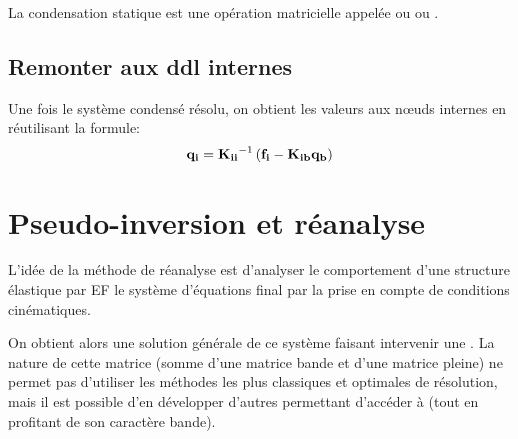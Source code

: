 La condensation statique est une opération matricielle 
appelée  ou  ou 
.

\medskip
\subsection{Remonter aux ddl internes}

Une fois le système condensé résolu, on obtient les valeurs aux nœuds
internes en réutilisant la formule:
\begin{equation}
\mathbf{q_i} = \mathbf{K_{ii}}^{-1}\left(\mathbf{f_i}-\mathbf{K_{ib}}\mathbf{q_b}\right)
\end{equation}






















\medskip
\section{Pseudo-inversion et réanalyse}\label{Sec-PInv}


\medskip
L'idée de la méthode de réanalyse est d'analyser le comportement d'une structure
élastique par EF  le système d'équations final par la prise en
compte de conditions cinématiques.

On obtient alors une solution générale de ce système faisant intervenir une
. La nature de cette matrice (somme
d'une matrice bande et d'une matrice pleine) ne permet pas d'utiliser les méthodes
les plus classiques et optimales de résolution, mais il est possible d'en développer d'autres 
permettant d'accéder à  (tout en profitant de son caractère bande).

